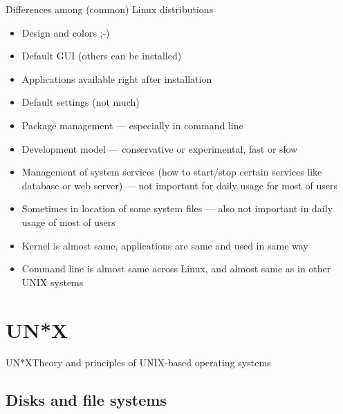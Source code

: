 \documentclass[compress, ucs, xelatex, 11pt, xcolor=svgnames,
  hyperref={
    bookmarks=true,
    unicode=true,
    colorlinks=true,
    pdftitle={Linux, command line and MetaCentrum},
    plainpages=false,
    pdfauthor={Vojtech Zeisek},
    pdfsubject={Course about use of Linux command line, writing shell scripts and using MetaCentrum of CESNET},
    pdfcreator={XeLaTeX},
    pdfkeywords={Linux, GNU, BASH, shell, command line, MetaCentrum},
    linkcolor=DarkRed,
    anchorcolor=DarkBlue,
    citecolor=Indigo,
    filecolor=NavyBlue,
    menucolor=DarkMagenta,
    urlcolor=DarkBlue,
    pdftex},
  url={hyphens, lowtilde} %
  ]{beamer}
\begin{document}
\begin{frame}{Differences among (common) Linux distributions}
  \begin{itemize}
    \item Design and colors ;-)
    \item Default GUI (others can be installed)
    \item Applications available right after installation
    \item Default settings (not much)
    \item Package management --- especially in command line
    \item Development model --- conservative or experimental, fast or slow
    \item Management of system services (how to start/stop certain services like database or web server) --- not important for daily usage for most of users
    \item Sometimes in location of some system files --- also not important in daily usage of most of users
    \item Kernel is almost same, applications are same and used in same way
    \item Command line is almost same across Linux, and almost same as in other UNIX systems
  \end{itemize}
\end{frame}

\section{UN*X}

\begin{frame}{UN*X}{Theory and principles of UNIX-based operating systems}
  \tableofcontents[currentsection, sectionstyle=show/hide, hideothersubsections]
\end{frame}

\subsection{Disks and file systems}
\end{document}

